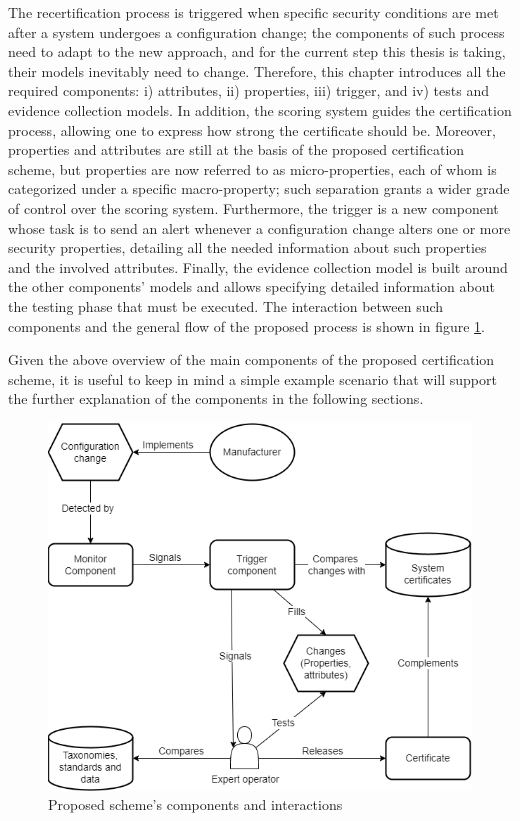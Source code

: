 The recertification process is triggered when specific security conditions are met after a system undergoes a configuration change; the components of such process need to adapt to the new approach, and for the current step this thesis is taking, their models inevitably need to change. Therefore, this chapter introduces all the required components: i) attributes, ii) properties, iii) trigger, and iv) tests and evidence collection models. In addition, the scoring system guides the certification process, allowing one to express how strong the certificate should be. Moreover, properties and attributes are still at the basis of the proposed certification scheme, but properties are now referred to as micro-properties, each of whom is categorized under a specific macro-property; such separation grants a wider grade of control over the scoring system. Furthermore, the trigger is a new component whose task is to send an alert whenever a configuration change alters one or more security properties, detailing all the needed information about such properties and the involved attributes. Finally, the evidence collection model is built around the other components' models and allows specifying detailed information about the testing phase that must be executed. The interaction between such components and the general flow of the proposed process is shown in figure \ref{fig:comps}.

Given the above overview of the main components of the proposed certification scheme, it is useful to keep in mind a simple example scenario that will support the further explanation of the components in the following sections.

\begin{figure}[ht]
    \centering
    \includegraphics[scale=0.7]{images/components.png}
    \caption{Proposed scheme's components and interactions}
    \label{fig:comps}
\end{figure}


